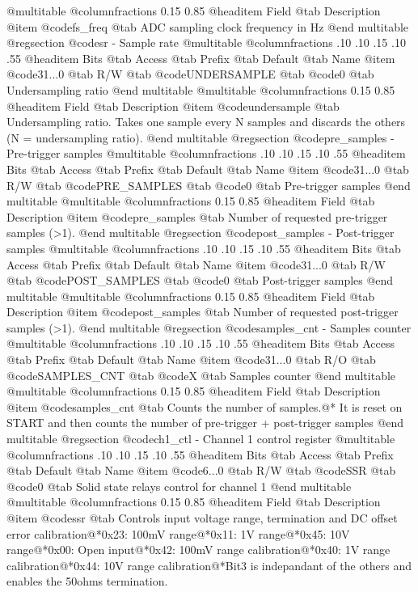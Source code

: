 @multitable @columnfractions 0.15 0.85
@headitem Field @tab Description
@item @code{fs_freq} @tab ADC sampling clock frequency in Hz
@end multitable
@regsection @code{sr} - Sample rate
@multitable @columnfractions .10 .10 .15 .10 .55
@headitem Bits @tab Access @tab Prefix @tab Default @tab Name
@item @code{31...0}
@tab R/W @tab
@code{UNDERSAMPLE}
@tab @code{0} @tab 
Undersampling ratio
@end multitable
@multitable @columnfractions 0.15 0.85
@headitem Field @tab Description
@item @code{undersample} @tab Undersampling ratio. Takes one sample every N samples and discards the others (N = undersampling ratio).
@end multitable
@regsection @code{pre_samples} - Pre-trigger samples
@multitable @columnfractions .10 .10 .15 .10 .55
@headitem Bits @tab Access @tab Prefix @tab Default @tab Name
@item @code{31...0}
@tab R/W @tab
@code{PRE_SAMPLES}
@tab @code{0} @tab 
Pre-trigger samples
@end multitable
@multitable @columnfractions 0.15 0.85
@headitem Field @tab Description
@item @code{pre_samples} @tab Number of requested pre-trigger samples (>1).
@end multitable
@regsection @code{post_samples} - Post-trigger samples
@multitable @columnfractions .10 .10 .15 .10 .55
@headitem Bits @tab Access @tab Prefix @tab Default @tab Name
@item @code{31...0}
@tab R/W @tab
@code{POST_SAMPLES}
@tab @code{0} @tab 
Post-trigger samples
@end multitable
@multitable @columnfractions 0.15 0.85
@headitem Field @tab Description
@item @code{post_samples} @tab Number of requested post-trigger samples (>1).
@end multitable
@regsection @code{samples_cnt} - Samples counter
@multitable @columnfractions .10 .10 .15 .10 .55
@headitem Bits @tab Access @tab Prefix @tab Default @tab Name
@item @code{31...0}
@tab R/O @tab
@code{SAMPLES_CNT}
@tab @code{X} @tab 
Samples counter
@end multitable
@multitable @columnfractions 0.15 0.85
@headitem Field @tab Description
@item @code{samples_cnt} @tab Counts the number of samples.@* It is reset on START and then counts the number of pre-trigger + post-trigger samples
@end multitable
@regsection @code{ch1_ctl} - Channel 1 control register
@multitable @columnfractions .10 .10 .15 .10 .55
@headitem Bits @tab Access @tab Prefix @tab Default @tab Name
@item @code{6...0}
@tab R/W @tab
@code{SSR}
@tab @code{0} @tab 
Solid state relays control for channel 1
@end multitable
@multitable @columnfractions 0.15 0.85
@headitem Field @tab Description
@item @code{ssr} @tab Controls input voltage range, termination and DC offset error calibration@*0x23: 100mV range@*0x11: 1V range@*0x45: 10V range@*0x00: Open input@*0x42: 100mV range calibration@*0x40: 1V range calibration@*0x44: 10V range calibration@*Bit3 is indepandant of the others and enables the 50ohms termination.
